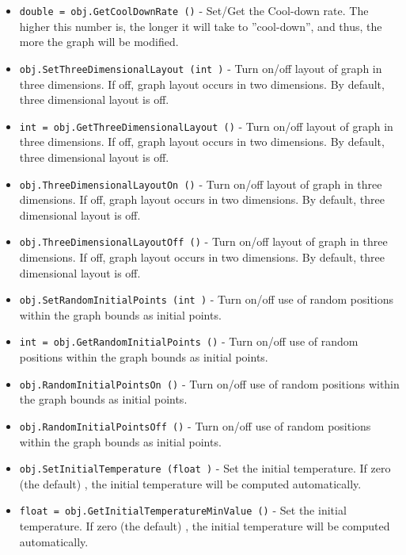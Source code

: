 \begin{itemize}
\item  \verb|double = obj.GetCoolDownRate ()| -  Set/Get the Cool-down rate.
 The higher this number is, the longer it will take to ''cool-down'',
 and thus, the more the graph will be modified.

\item  \verb|obj.SetThreeDimensionalLayout (int )| -  Turn on/off layout of graph in three dimensions. If off, graph
 layout occurs in two dimensions. By default, three dimensional
 layout is off.

\item  \verb|int = obj.GetThreeDimensionalLayout ()| -  Turn on/off layout of graph in three dimensions. If off, graph
 layout occurs in two dimensions. By default, three dimensional
 layout is off.

\item  \verb|obj.ThreeDimensionalLayoutOn ()| -  Turn on/off layout of graph in three dimensions. If off, graph
 layout occurs in two dimensions. By default, three dimensional
 layout is off.

\item  \verb|obj.ThreeDimensionalLayoutOff ()| -  Turn on/off layout of graph in three dimensions. If off, graph
 layout occurs in two dimensions. By default, three dimensional
 layout is off.

\item  \verb|obj.SetRandomInitialPoints (int )| -  Turn on/off use of random positions within the graph bounds as initial points.

\item  \verb|int = obj.GetRandomInitialPoints ()| -  Turn on/off use of random positions within the graph bounds as initial points.

\item  \verb|obj.RandomInitialPointsOn ()| -  Turn on/off use of random positions within the graph bounds as initial points.

\item  \verb|obj.RandomInitialPointsOff ()| -  Turn on/off use of random positions within the graph bounds as initial points.

\item  \verb|obj.SetInitialTemperature (float )| -  Set the initial temperature.  If zero (the default) , the initial temperature
 will be computed automatically.

\item  \verb|float = obj.GetInitialTemperatureMinValue ()| -  Set the initial temperature.  If zero (the default) , the initial temperature
 will be computed automatically.


\end{itemize}
